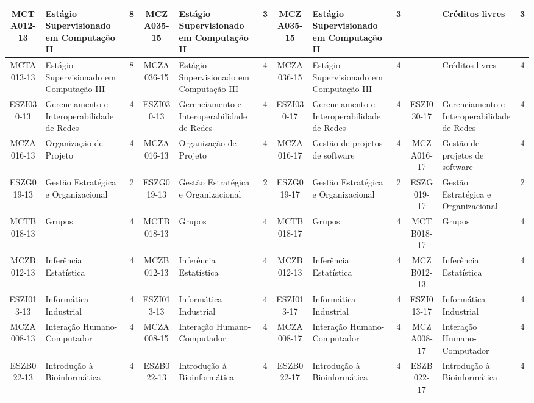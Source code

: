 \begin{landscape}
{\begin{longtable}{|c|p{.2\textheight}|c||c|p{.2\textheight}|c||c|p{.2\textheight}|c||c|p{.2\textheight}|c|}
MCTA012-13 & Estágio Supervisionado em Computação II& 8 &
MCZA035-15 & Estágio Supervisionado em Computação II & 3 &
MCZA035-15 & Estágio Supervisionado em Computação II & 3 &
& Créditos livres & 3 \\ \hline

MCTA013-13 & Estágio Supervisionado em Computação III& 8 &
MCZA036-15 & Estágio Supervisionado em Computação III & 4 &
MCZA036-15 & Estágio Supervisionado em Computação III & 4 &
& Créditos livres & 4\\ \hline

ESZI030-13 & Gerenciamento e Interoperabilidade de Redes & 4 &
ESZI030-13 & Gerenciamento e Interoperabilidade de Redes & 4 &
ESZI030-17 & Gerenciamento e Interoperabilidade de Redes & 4 & 
ESZI030-17 & Gerenciamento e Interoperabilidade de Redes & 4\\ \hline

MCZA016-13 & Organização de Projeto & 4 &
MCZA016-13 & Organização de Projeto & 4 &
MCZA016-17 & Gestão de projetos de software & 4 & 
MCZA016-17 & Gestão de projetos de software & 4\\ \hline

ESZG019-13 & Gestão Estratégica e Organizacional & 2 &
ESZG019-13 & Gestão Estratégica e Organizacional & 2 &
ESZG019-17 & Gestão Estratégica e Organizacional & 2 &
ESZG019-17 & Gestão Estratégica e Organizacional & 2\\ \hline

MCTB018-13 & Grupos & 4 &
MCTB018-13 & Grupos & 4 &
MCTB018-17 & Grupos & 4 &
MCTB018-17 & Grupos & 4\\ \hline

MCZB012-13 & Inferência Estatística & 4 &
MCZB012-13 & Inferência Estatística & 4 &
MCZB012-13 & Inferência Estatística & 4 &
MCZB012-13 & Inferência Estatística & 4\\ \hline

ESZI013-13 & Informática Industrial & 4 &
ESZI013-13 & Informática Industrial & 4 &
ESZI013-17 & Informática Industrial & 4 & 
ESZI013-17 & Informática Industrial & 4\\ \hline

MCZA008-13 & Interação Humano-Computador & 4 &
MCZA008-15 & Interação Humano-Computador & 4 &
MCZA008-17 & Interação Humano-Computador & 4 &
MCZA008-17 & Interação Humano-Computador & 4\\ \hline

ESZB022-13 & Introdução à Bioinformática & 4 &
ESZB022-13 & Introdução à Bioinformática & 4 &
ESZB022-17 & Introdução à Bioinformática & 4 & 
ESZB022-17 & Introdução à Bioinformática & 4\\ \hline


\end{longtable}}
\end{landscape}
